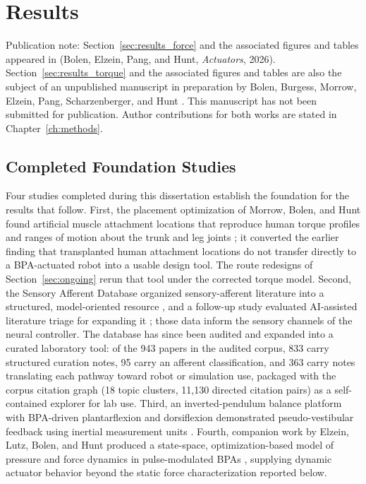 \chapter{Results}\label{ch:results}
\graphicspath{{../Figures/30-results/}}

{\doublespacing\normalsize\upshape
\noindent Publication note: Section~\ref{sec:results_force} and the associated figures and tables appeared in \citet{bolen_2026} (Bolen, Elzein, Pang, and Hunt, \emph{Actuators}, 2026). Section~\ref{sec:results_torque} and the associated figures and tables are also the subject of an unpublished manuscript in preparation by Bolen, Burgess, Morrow, Elzein, Pang, Scharzenberger, and Hunt \citep{bolen_isometric_2025}. This manuscript has not been submitted for publication. Author contributions for both works are stated in Chapter~\ref{ch:methods}.\par}

\section{Completed Foundation Studies}\label{sec:foundation}

Four studies completed during this dissertation establish the foundation for the results that follow. First, the placement optimization of Morrow, Bolen, and Hunt found artificial muscle attachment locations that reproduce human torque profiles and ranges of motion about the trunk and leg joints \citep{morrow_optimization_2020}; it converted the earlier finding that transplanted human attachment locations do not transfer directly to a BPA-actuated robot \citep{bolen_bipedal_2019, bolen_determination_2019} into a usable design tool. The route redesigns of Section~\ref{sec:ongoing} rerun that tool under the corrected torque model. Second, the Sensory Afferent Database organized sensory-afferent literature into a structured, model-oriented resource \citep{bolen_sensory_2023}, and a follow-up study evaluated AI-assisted literature triage for expanding it \citep{bolen_using_2024}; those data inform the sensory channels of the neural controller. The database has since been audited and expanded into a curated laboratory tool: of the 943 papers in the audited corpus, 833 carry structured curation notes, 95 carry an afferent classification, and 363 carry notes translating each pathway toward robot or simulation use, packaged with the corpus citation graph (18 topic clusters, 11,130 directed citation pairs) as a self-contained explorer for lab use. Third, an inverted-pendulum balance platform with BPA-driven plantarflexion and dorsiflexion demonstrated pseudo-vestibular feedback using inertial measurement units \citep{bolen_balance_2024, bolen_selfbalancing_2024, bolen_selfbalancing_srs_2024}. Fourth, companion work by Elzein, Lutz, Bolen, and Hunt produced a state-space, optimization-based model of pressure and force dynamics in pulse-modulated BPAs \citep{elzein_pressure_2025}, supplying dynamic actuator behavior beyond the static force characterization reported below.


